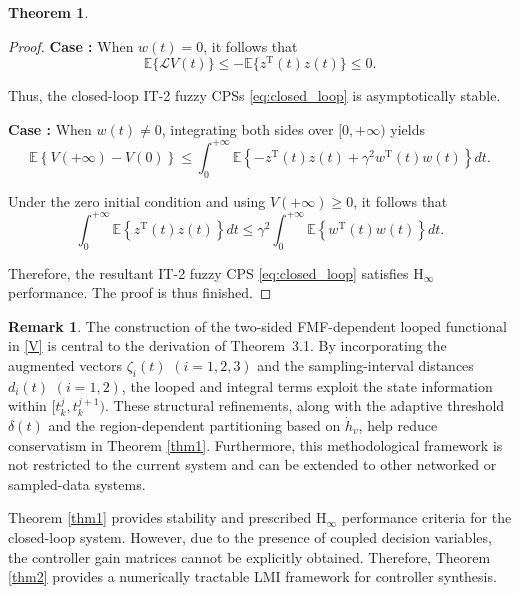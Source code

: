 \documentclass[preprint,review,fleqn,sort&compress,3p]{elsarticle}
\theoremstyle{definition} %
\theoremstyle{definition}%
\newtheorem{thm}{Theorem}[section]
\newtheorem{rem}{Remark}[section]
\begin{document}
\begin{thm}
\begin{proof}
\textbf{Case \uppercase\expandafter{}:} When $w(t)=0$, it follows that
\begin{equation}
	\mathbb{E}\{\mathcal{L}V(t)\}
	\leq
	-\mathbb{E}\{z^{\mathrm{T}}(t)z(t)\}
	\leq 0.
\end{equation}

Thus, the closed-loop IT-2 fuzzy CPSs \eqref{eq:closed_loop} is asymptotically stable.

\textbf{Case \uppercase\expandafter{}:} When $w(t)\neq0$, integrating both sides over $[0,+\infty)$ yields
\begin{equation}
	\mathbb{E}\left\{V(+\infty)-V(0)\right\}
	\leq
	\int_{0}^{+\infty}
	\mathbb{E}\left\{
	-z^{\mathrm{T}}(t)z(t)
	+\gamma^2 w^{\mathrm{T}}(t)w(t)
	\right\}dt.
\end{equation}

Under the zero initial condition and using $V(+\infty)\ge0$, it follows that
\begin{equation}
	\int_{0}^{+\infty}
	\mathbb{E}\left\{
	z^{\mathrm{T}}(t)z(t)
	\right\}dt
	\leq
	\gamma^2
	\int_{0}^{+\infty}
	\mathbb{E}\left\{
	w^{\mathrm{T}}(t)w(t)
	\right\}dt.
\end{equation}

Therefore, the resultant IT-2 fuzzy CPS \eqref{eq:closed_loop} satisfies $\mathrm{H}_\infty$ performance. The proof is thus finished.
\end{proof}
\end{thm}
\begin{rem}
The construction of the two-sided FMF-dependent looped functional in \eqref{V} is central to the derivation of Theorem~3.1.
By incorporating the augmented vectors $\zeta_i(t)$ $(i=1,2,3)$ and the sampling-interval distances $d_i(t)$ $(i=1,2)$, the looped and integral terms exploit the state information within $[t_k^j,t_k^{j+1})$.
These structural refinements, along with the adaptive threshold $\delta(t)$ and the region-dependent partitioning based on $\dot{h}_v$, help reduce conservatism in Theorem \ref{thm1}.
Furthermore, this methodological framework is not restricted to the current system and can be extended to other networked or sampled-data systems.
\end{rem}
Theorem \ref{thm1} provides stability and prescribed $\mathrm{H}_{\infty}$ performance criteria for the closed-loop system.
However, due to the presence of coupled decision variables, the controller gain matrices cannot be explicitly obtained. Therefore, Theorem \ref{thm2} provides a numerically tractable LMI framework for controller synthesis.
\end{document}
